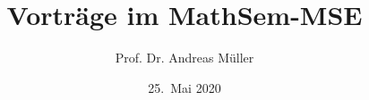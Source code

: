 %
%
%


\beamertemplatenavigationsymbolsempty
\title[Vorträge]{Vorträge im MathSem-MSE}
\author[A.~Müller]{Prof. Dr. Andreas Müller}
\date[25. 5. 2020]{25.~Mai 2020}

